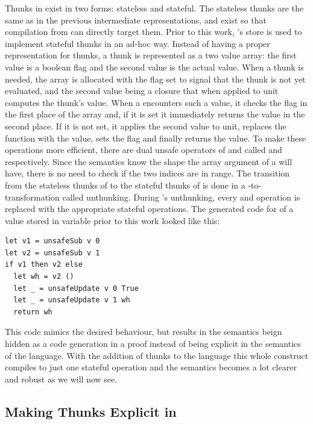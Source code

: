 Thunks in \StateLang{} exist in two forms: stateless and stateful. The stateless
thunks are the same as in the previous intermediate representations, and exist
so that compilation from \EnvLang{} can directly target them. Prior to this
work, \StateLang{}'s store is used to implement stateful thunks in an ad-hoc
way. Instead of having a proper representation for thunks, a thunk is
represented as a two value array: the first value is a boolean flag and the
second value is the actual value. When a thunk is needed, the array is allocated
with the flag set to signal that the thunk is not yet evaluated, and the second
value being a closure that when applied to unit computes the thunk's value. When
a  encounters such a value, it checks the flag in the first place of
the array and, if it is set it immediately returns the value in the second
place. If it is not set, it applies the second value to unit, replaces the
function with the value, sets the flag and finally returns the value. To make
these operations more efficient, there are dual unsafe operators of 
and  called  and  respectively.
Since the semantics know the shape the array argument of a  will
have, there is no need to check if the two indices are in range. The transition
from the stateless thunks of \ThunkLang{} to the stateful thunks of \StateLang{}
is done in a \StateLang{}-to-\StateLang{} transformation called unthunking.
During \StateLang{}'s unthunking, every  and  operation is
replaced with the appropriate stateful operations. The generated code for
 of a value stored in variable  prior to this work looked
like this:
\begin{verbatim}
let v1 = unsafeSub v 0
let v2 = unsafeSub v 1
if v1 then v2 else
  let wh = v2 ()
  let _ = unsafeUpdate v 0 True
  let _ = unsafeUpdate v 1 wh
  return wh
\end{verbatim}
This code mimics the desired behaviour, but results in the semantics beign
hidden as a code generation in a proof instead of being explicit in the
semantics of the language. With the addition of thunks to the language this
whole construct compiles to just one stateful operation and the semantics
becomes a lot clearer and robust as we will now see.

\subsection{Making Thunks Explicit in \StateLang{}}

